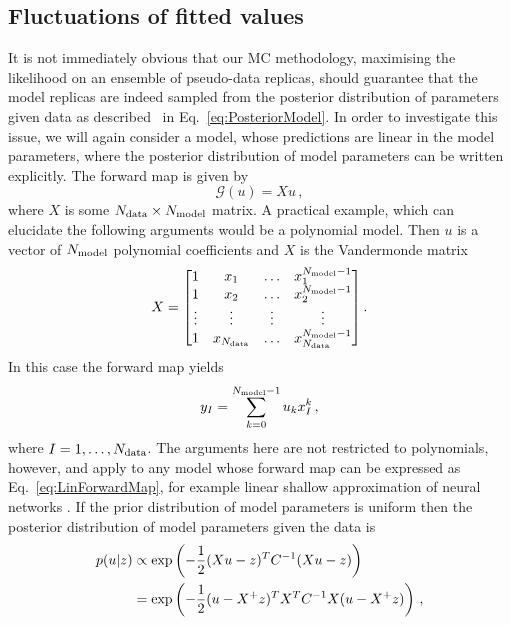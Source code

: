 \subsection{Fluctuations of fitted values}
\label{sec:fluct-fit-values}

It is not immediately obvious that our MC methodology, maximising the likelihood
on an ensemble of pseudo-data replicas, should guarantee that the model replicas
are indeed sampled from the posterior distribution of parameters given data as
described \eg\ in Eq.~\ref{eq:PosteriorModel}. In order to investigate this
issue, we will again consider a model, whose predictions are linear in the model
parameters, where the posterior distribution of model parameters can be written
explicitly. The forward map is given by
\begin{equation}\label{eq:LinForwardMap}
    \mathcal G(u) = X u\, ,
\end{equation}
where $X$ is some $N_{\rm data}\times N_{\rm model}$ matrix. A practical example, which can
elucidate the following arguments would be a polynomial model. Then $u$ is a
vector of $N_{\rm model}$ polynomial coefficients and $X$ is the Vandermonde matrix
\begin{equation}
    X =
    \begin{bmatrix}
        1  & x_1 & \ldots& x_1^{N_{\rm model}-1} \\ 
        1  & x_2 & \ldots& x_2^{N_{\rm model}-1} \\ 
        \vdots  & \vdots & \vdots& \vdots \\ 
        1  & x_{N_{\rm data}} & \ldots & x_{N_{\rm data}}^{N_{\rm model}-1} 
    \end{bmatrix}.
\end{equation}
In this case the forward map yields
\begin{equation}
    \label{eq:PolyMod}
    y_I = \sum_{k=0}^{N_{\rm model}-1} u_k x_I^k\, , 
\end{equation}
where $I=1,\ldots,N_{\rm data}$. The arguments here are not restricted to polynomials,
however, and apply to any model whose forward map can be expressed as
Eq.~\eqref{eq:LinForwardMap}, for example linear shallow approximation of neural
networks \cite{ADVANI2020428}. If the prior distribution of model parameters is
uniform then the posterior distribution of model parameters given the data is
\begin{equation}
    \label{eq:PosteriorMultiGaussModel}
    \begin{split}
        p(u | z) &\propto
        \exp \left( -\frac{1}{2} (Xu - z)^T C^{-1}_{} (Xu - z)\right) \\
        &= \exp \left( -\frac{1}{2} (u - X^+z)^T X^TC^{-1}_{}X (u - X^+z)\right)\, ,
    \end{split}
\end{equation}
